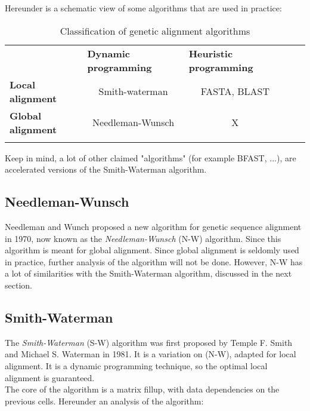 Hereunder is a schematic view of some algorithms that are used in practice:

\begin{table}[H]
	\begin{tabular}{lllll}
		\cline{1-3}
		\multicolumn{1}{|l|}{}                          & \multicolumn{1}{l|}{\textbf{Dynamic programming}} & \multicolumn{1}{l|}{\textbf{Heuristic programming}} &  &  \\ \cline{1-3}
		\multicolumn{1}{|l|}{\textbf{Local alignment}}  & \multicolumn{1}{c|}{Smith-waterman}               & \multicolumn{1}{c|}{FASTA, BLAST}                   &  &  \\ \cline{1-3}
		\multicolumn{1}{|l|}{\textbf{Global alignment}} & \multicolumn{1}{c|}{Needleman-Wunsch}             & \multicolumn{1}{c|}{X}                              &  &  \\ \cline{1-3}
		&                                                   &                                                     &  & 
	\end{tabular}
	\caption{Classification of genetic alignment algorithms}
\end{table}


Keep in mind, a lot of other claimed "algorithms" (for example BFAST, ...), are accelerated versions of the Smith-Waterman algorithm.

\subsection{Needleman-Wunsch}
Needleman and Wunch proposed a new algorithm for genetic sequence alignment in 1970, now known as the \emph{Needleman-Wunsch} (N-W) algorithm. Since this algorithm is meant for global alignment. Since global alignment is seldomly used in practice, further analysis of the algorithm will not be done. However, N-W has a lot of similarities with the Smith-Waterman algorithm, discussed in the next section.

\subsection{Smith-Waterman}
The \emph{Smith-Waterman} (S-W) algorithm was first proposed by Temple F. Smith and Michael S. Waterman in 1981. It is a variation on (N-W), adapted for local alignment. It is a dynamic programming technique, so the optimal local alignment is guaranteed. \\

The core of the algorithm is a matrix fillup, with data dependencies on the previous cells. Hereunder an analysis of the algorithm:

